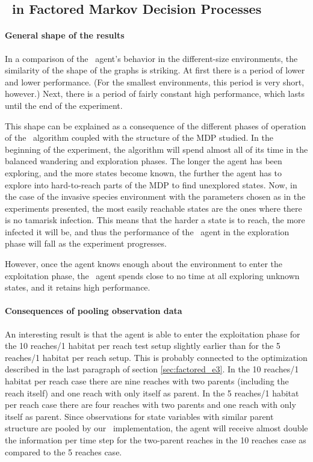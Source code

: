 \subsection{\etre\ in Factored Markov Decision Processes 
}
\label{sec:e3_factored_discussion}

\paragraph{General shape of the results} In a comparison of the \etre\ agent's behavior in the different-size environments, the similarity of the shape of the graphs is striking. At first there is a period of lower and lower performance. (For the smallest environments, this period is very short, however.) Next, there is a period of fairly constant high performance, which lasts until the end of the experiment.  

This shape can be explained as a consequence of the different phases of operation of the \etre\ algorithm coupled with the structure of the MDP studied. In the beginning of the experiment, the algorithm will spend almost all of its time in the balanced wandering and exploration phases. The longer the agent has been exploring, and the more states become known, the further the agent has to explore into hard-to-reach parts of the MDP to find unexplored states. Now, in the case of the invasive species environment with the parameters chosen as in the experiments presented, the most easily reachable states are the ones where there is no tamarisk infection. This means that the harder a state is to reach, the more infected it will be, and thus the performance of the \etre\ agent in the exploration phase will fall as the experiment progresses. 

However, once the agent knows enough about the environment to enter the exploitation phase, the \etre\ agent spends close to no time at all exploring unknown states, and it retains high performance. 

\paragraph{Consequences of pooling observation data} An interesting result is that the agent is able to enter the exploitation phase for the 10 reaches/1 habitat per reach test setup slightly earlier than for the 5 reaches/1 habitat per reach setup. This is probably connected to the optimization described in the last paragraph of section \ref{sec:factored_e3}. In the 10 reaches/1 habitat per reach case there are nine reaches with two parents (including the reach itself) and one reach with only itself as parent. In the 5 reaches/1 habitat per reach case there are four reaches with two parents and one reach with only itself as parent. Since observations for state variables with similar parent structure are pooled by our \etre\ implementation, the agent will receive almost double the information per time step for the two-parent reaches in the 10 reaches case as compared to the 5 reaches case.  


